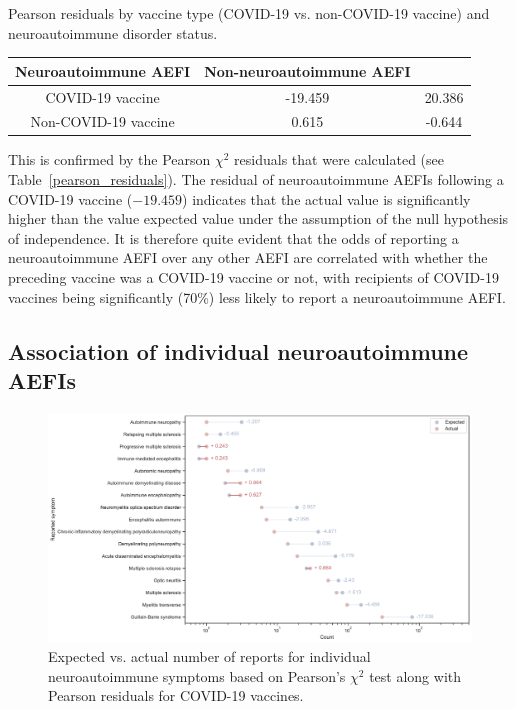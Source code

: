 \documentclass[idr,communication,submit,oneauthor,pdftex]{Definitions/mdpi}
\begin{document}
\begin{specialtable}[H]
\caption{Pearson residuals by vaccine type (COVID-19 vs. non-COVID-19 vaccine) and neuroautoimmune
disorder status.\label{pearson_residuals}}
\begin{tabular}{ccc}
\toprule
\textbf{Neuroautoimmune AEFI}	& \textbf{Non-neuroautoimmune AEFI}\\
\midrule
COVID-19 vaccine	    	& -19.459			    & 20.386  \\
Non-COVID-19 vaccine		& 0.615			        & -0.644\\
\bottomrule
\end{tabular}
\end{specialtable}

This is confirmed by the Pearson $\chi^2$ residuals that were calculated (see Table~\ref{pearson_residuals}). The
residual of neuroautoimmune AEFIs following a COVID-19 vaccine ($-19.459$) indicates that the actual value is
significantly higher than the value expected value under the assumption of the null hypothesis of independence. It is
therefore quite evident that the odds of reporting a neuroautoimmune AEFI over any other AEFI are correlated with
whether the preceding vaccine was a COVID-19 vaccine or not, with recipients of COVID-19 vaccines being significantly
(70\%) less likely to report a neuroautoimmune AEFI.

\subsection{Association of individual neuroautoimmune AEFIs}

\begin{figure}[H]
\includegraphics[width=12.5 cm]{expected_vs_actual_by_symptoms}
\caption{Expected vs. actual number of reports for individual neuroautoimmune symptoms based on Pearson's $\chi^2$ test
along with Pearson residuals for COVID-19 vaccines.\label{expected_vs_actual}}
\end{figure}
\end{document}
